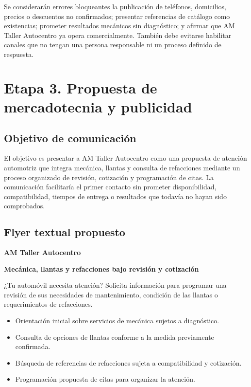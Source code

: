 \documentclass[12pt,letterpaper,oneside]{article}
\begin{document}
Se considerarán errores bloqueantes la publicación de teléfonos, domicilios, precios o descuentos no confirmados; presentar referencias de catálogo como existencias; prometer resultados mecánicos sin diagnóstico; y afirmar que AM Taller Autocentro ya opera comercialmente. También debe evitarse habilitar canales que no tengan una persona responsable ni un proceso definido de respuesta.

\section{Etapa 3. Propuesta de mercadotecnia y publicidad}

\subsection{Objetivo de comunicación}

El objetivo es presentar a AM Taller Autocentro como una propuesta de atención automotriz que integra mecánica, llantas y consulta de refacciones mediante un proceso organizado de revisión, cotización y programación de citas. La comunicación facilitaría el primer contacto sin prometer disponibilidad, compatibilidad, tiempos de entrega o resultados que todavía no hayan sido comprobados.

\subsection{Flyer textual propuesto}

\textbf{AM Taller Autocentro}

\textbf{Mecánica, llantas y refacciones bajo revisión y cotización}

¿Tu automóvil necesita atención? Solicita información para programar una revisión de sus necesidades de mantenimiento, condición de las llantas o requerimientos de refacciones.

\begin{itemize}
    \item Orientación inicial sobre servicios de mecánica sujetos a diagnóstico.
    \item Consulta de opciones de llantas conforme a la medida previamente confirmada.
    \item Búsqueda de referencias de refacciones sujeta a compatibilidad y cotización.
    \item Programación propuesta de citas para organizar la atención.
\end{itemize}
\end{document}
